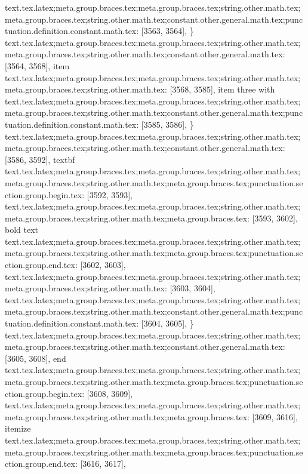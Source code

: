 {{{{{{{{{{{{{{{{{{{{{{{{{{{{{{{{{{{{{{{{{{{{{{{{{{{{{{{{{{{{{{{{{{{{{{{{{{{{{{{{{{{{{{{{{{{{{{{{{{{{{{{{{{{{{text.tex.latex;meta.group.braces.tex;meta.group.braces.tex;string.other.math.tex;meta.group.braces.tex;string.other.math.tex;constant.other.general.math.tex;punctuation.definition.constant.math.tex: [3563, 3564], {\}
text.tex.latex;meta.group.braces.tex;meta.group.braces.tex;string.other.math.tex;meta.group.braces.tex;string.other.math.tex;constant.other.general.math.tex: [3564, 3568], {item}
text.tex.latex;meta.group.braces.tex;meta.group.braces.tex;string.other.math.tex;meta.group.braces.tex;string.other.math.tex: [3568, 3585], { item three with }
text.tex.latex;meta.group.braces.tex;meta.group.braces.tex;string.other.math.tex;meta.group.braces.tex;string.other.math.tex;constant.other.general.math.tex;punctuation.definition.constant.math.tex: [3585, 3586], {\}
text.tex.latex;meta.group.braces.tex;meta.group.braces.tex;string.other.math.tex;meta.group.braces.tex;string.other.math.tex;constant.other.general.math.tex: [3586, 3592], {textbf}
text.tex.latex;meta.group.braces.tex;meta.group.braces.tex;string.other.math.tex;meta.group.braces.tex;string.other.math.tex;meta.group.braces.tex;punctuation.section.group.begin.tex: [3592, 3593], {{}
text.tex.latex;meta.group.braces.tex;meta.group.braces.tex;string.other.math.tex;meta.group.braces.tex;string.other.math.tex;meta.group.braces.tex: [3593, 3602], {bold text}
text.tex.latex;meta.group.braces.tex;meta.group.braces.tex;string.other.math.tex;meta.group.braces.tex;string.other.math.tex;meta.group.braces.tex;punctuation.section.group.end.tex: [3602, 3603], {}}
text.tex.latex;meta.group.braces.tex;meta.group.braces.tex;string.other.math.tex;meta.group.braces.tex;string.other.math.tex: [3603, 3604], {
}
text.tex.latex;meta.group.braces.tex;meta.group.braces.tex;string.other.math.tex;meta.group.braces.tex;string.other.math.tex;constant.other.general.math.tex;punctuation.definition.constant.math.tex: [3604, 3605], {\}
text.tex.latex;meta.group.braces.tex;meta.group.braces.tex;string.other.math.tex;meta.group.braces.tex;string.other.math.tex;constant.other.general.math.tex: [3605, 3608], {end}
text.tex.latex;meta.group.braces.tex;meta.group.braces.tex;string.other.math.tex;meta.group.braces.tex;string.other.math.tex;meta.group.braces.tex;punctuation.section.group.begin.tex: [3608, 3609], {{}
text.tex.latex;meta.group.braces.tex;meta.group.braces.tex;string.other.math.tex;meta.group.braces.tex;string.other.math.tex;meta.group.braces.tex: [3609, 3616], {itemize}
text.tex.latex;meta.group.braces.tex;meta.group.braces.tex;string.other.math.tex;meta.group.braces.tex;string.other.math.tex;meta.group.braces.tex;punctuation.section.group.end.tex: [3616, 3617], {}}
}}}}}}}}}}}}}}}}}}}}}}}}}}}}}}}}}}}}}}}}}}}}}}}}}}}}}}}}}}}}}}}}}}}}}}}}}}}}}}}}}}}}}}}}}}}}}}}}}}}}}}}}}}}}}}}}
